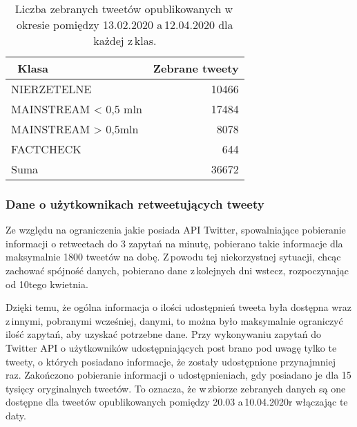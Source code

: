 \begin{table}[!h] \centering
\caption{Liczba zebranych tweetów opublikowanych w\,okresie pomiędzy 13.02.2020 a\,12.04.2020 dla każdej z\,klas.}  \label{tab:zebranetweety}
\begin{tabular}{|l|r|} 
\hline
~Klasa & Zebrane tweety \\ 
\hline \hline
NIERZETELNE & 10466 \\ 
\hline
MAINSTREAM \textless{} 0,5 mln & 17484 \\ 
\hline
MAINSTREAM \textgreater{} 0,5mln & 8078 \\ 
\hline
FACTCHECK & 644 \\
\hline 
Suma & 36672 \\
\hline 
\end{tabular}

\end{table}

\subsubsection{Dane o użytkownikach retweetujących tweety}
Ze względu na ograniczenia jakie posiada API Twitter, spowalniające pobieranie informacji o retweetach do 3 zapytań na minutę, pobierano takie informacje dla maksymalnie 1800 tweetów na dobę. Z\,powodu tej niekorzystnej sytuacji, chcąc zachować spójność danych, pobierano dane z\,kolejnych dni wstecz, rozpoczynając od 10tego kwietnia. 
\par 
Dzięki temu, że ogólna informacja o ilości udostępnień tweeta była dostępna wraz z\,innymi, pobranymi wcześniej, danymi, to można było maksymalnie ograniczyć ilość zapytań, aby uzyskać potrzebne dane. Przy wykonywaniu zapytań do Twitter API o użytkowników udostępniających post brano pod uwagę tylko te tweety, o których posiadano informacje, że zostały udostępnione przynajmniej raz. Zakończono pobieranie informacji o udostępnieniach, gdy posiadano je dla 15 tysięcy oryginalnych tweetów. To oznacza, że w\,zbiorze zebranych danych są one dostępne dla tweetów opublikowanych pomiędzy 20.03 a\,10.04.2020r włączając te daty.  